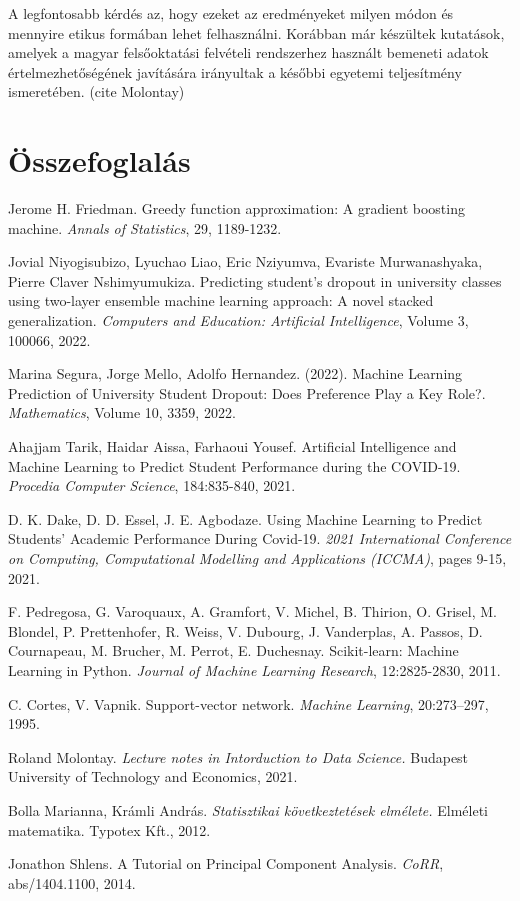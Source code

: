 \documentclass[12pt]{article}
\begin{document}
A legfontosabb kérdés az, hogy ezeket az eredményeket milyen módon és mennyire etikus formában lehet felhasználni. Korábban már készültek kutatások, amelyek a magyar felsőoktatási felvételi rendszerhez használt bemeneti adatok értelmezhetőségének javítására irányultak a későbbi egyetemi teljesítmény ismeretében. (cite Molontay) 



\section{Összefoglalás}


\newpage
\begin{thebibliography}{9}
Jerome H. Friedman. Greedy function approximation: A gradient boosting machine. 
\textit{Annals of Statistics}, 29, 1189-1232.

Jovial Niyogisubizo, Lyuchao Liao, Eric Nziyumva, Evariste Murwanashyaka, Pierre Claver Nshimyumukiza.
Predicting student's dropout in university classes using two-layer ensemble machine learning approach: A novel stacked generalization.
\textit{Computers and Education: Artificial Intelligence}, Volume 3, 100066, 2022.

Marina Segura, Jorge Mello, Adolfo Hernandez. (2022). Machine Learning Prediction of University Student Dropout: Does Preference Play a Key Role?. \textit{Mathematics}, Volume 10, 3359, 2022.

Ahajjam Tarik, Haidar Aissa, Farhaoui Yousef. Artificial Intelligence and Machine Learning to Predict Student Performance during the COVID-19. \textit{Procedia Computer Science}, 184:835-840, 2021.

D. K. Dake, D. D. Essel, J. E. Agbodaze. Using Machine Learning to Predict Students' Academic Performance During Covid-19. \textit{2021 International Conference on Computing, Computational Modelling and Applications (ICCMA)}, pages 9-15, 2021.

 F. Pedregosa, G. Varoquaux, A. Gramfort, V. Michel, B. Thirion, O. Grisel, M. Blondel, P. Prettenhofer, R. Weiss, V. Dubourg, J. Vanderplas, A. Passos, D. Cournapeau, M. Brucher, M. Perrot, E. Duchesnay. Scikit-learn: Machine Learning in Python. \textit{Journal of Machine Learning Research}, 12:2825-2830, 2011.

 C. Cortes, V. Vapnik. Support-vector network. \textit{Machine Learning}, 20:273–297,
1995.

 Roland Molontay. \textit{Lecture notes in Intorduction to Data Science.} Budapest University of Technology and Economics, 2021.

 Bolla Marianna, Krámli András.  \textit{Statisztikai következtetések elmélete.}  Elméleti matematika. Typotex Kft., 2012.

Jonathon Shlens. A Tutorial on Principal Component Analysis. \textit{CoRR}, abs/1404.1100, 2014.

\end{thebibliography}
\end{document}

